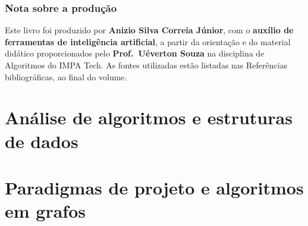\documentclass[11pt,a4paper,oneside,openany]{book}
\theoremstyle{plain}
\theoremstyle{definition}
\theoremstyle{remark}
\numberwithin{equation}{chapter}
\begin{document}
\section*{Nota sobre a produção}
Este livro foi produzido por \textbf{Anizio Silva Correia Júnior}, com o \textbf{auxílio de ferramentas de inteligência artificial}, a partir da orientação e do material didático proporcionados pelo \textbf{Prof.\ Uéverton Souza} na disciplina de Algoritmos do IMPA Tech. As fontes utilizadas estão listadas nas Referências bibliográficas, ao final do volume.

\tableofcontents

\mainmatter
\part{Análise de algoritmos e estruturas de dados}











\part{Paradigmas de projeto e algoritmos em grafos}










\appendix




\backmatter

\printindex
\end{document}
